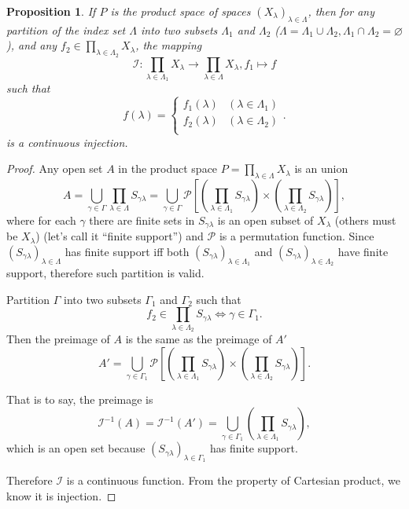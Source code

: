 \documentclass[12pt, letterpaper]{article}
\renewcommand{\emptyset}{\varnothing}
\newtheorem{prop}{Proposition}[section]
\theoremstyle{definition}
\theoremstyle{remark}
\theoremstyle{definition}
\theoremstyle{plain}
\numberwithin{equation}{section}
\begin{document}
	\begin{prop}\label{propContinuousInjection}
		If $P$ is the product space of spaces $(X_\lambda)_{\lambda\in \Lambda}$, then for any partition of the index set $\Lambda$
		into two subsets $\Lambda_1$ and $\Lambda_2$
		($\Lambda = \Lambda_1 \cup \Lambda_2, \Lambda_1 \cap \Lambda_2=\emptyset$), and
		any $f_2\in \prod_{\lambda\in\Lambda_2} X_\lambda$, the mapping
		\[\mathcal{I}\colon\prod_{\lambda\in\Lambda_1} X_\lambda\to\prod_{\lambda\in\Lambda} X_\lambda, f_1 \mapsto f  \]
		such that
		\[f(\lambda)=\begin{cases}
			f_1(\lambda) & (\lambda\in\Lambda_1)\\
			f_2(\lambda) & (\lambda\in\Lambda_2)\\
		\end{cases}.
		\]
		is a continuous injection.
	\end{prop}
	\begin{proof}
		Any open set $A$ in the product space $P=\prod_{\lambda\in\Lambda} X_\lambda$
		is an union
		\[ A = \bigcup_{\gamma\in \Gamma} \prod_{\lambda\in \Lambda} S_{\gamma\lambda} =
		\bigcup_{\gamma\in \Gamma} \mathscr{P} \left[
		\left(\prod_{\lambda\in \Lambda_1} S_{\gamma\lambda}\right)
		\times
		\left(\prod_{\lambda\in \Lambda_2} S_{\gamma\lambda}\right) \right]
		 ,\]
		 where for each $\gamma$ there are finite sets in $S_{\gamma\lambda}$ is an open subset of $X_\lambda$
		 (others must be $X_\lambda$) (let's call it ``finite support'') and $\mathscr{P}$ is a permutation function.
		 Since $(S_{\gamma\lambda})_{\lambda\in\Lambda}$ has finite support iff
		 both $(S_{\gamma\lambda})_{\lambda\in\Lambda_1}$ and $(S_{\gamma\lambda})_{\lambda\in\Lambda_2}$
		 have finite support, therefore such partition is valid.
		 
		 Partition $\Gamma$ into two subsets $\Gamma_1$ and $\Gamma_2$ such that
		 \[f_2\in \prod_{\lambda\in \Lambda_2} S_{\gamma\lambda} \iff \gamma \in \Gamma_1. \]
		 Then the preimage of $A$ is the same as the preimage of $A'$
		 \[ A' = 
		 \bigcup_{\gamma\in \Gamma_1} \mathscr{P} \left[
		 \left(\prod_{\lambda\in \Lambda_1} S_{\gamma\lambda}\right)
		 \times
		 \left(\prod_{\lambda\in \Lambda_2} S_{\gamma\lambda}\right) \right]
		 .\]
		 
		 That is to say, the preimage is
		 \[\mathcal{I}^{-1}(A)=\mathcal{I}^{-1}(A')=\bigcup_{\gamma\in \Gamma_1}
		 \left(\prod_{\lambda\in \Lambda_1} S_{\gamma\lambda}\right), \]
		 which is an open set because $(S_{\gamma\lambda})_{\lambda\in\Gamma_1}$ has finite support.
		 
		 Therefore $\mathcal{I}$ is a continuous function.
		 From the property of Cartesian product, we know it is injection.
	\end{proof}
\end{document}
